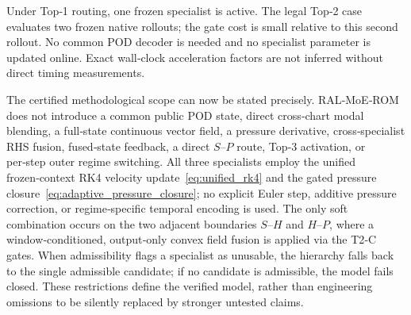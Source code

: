 Under Top‑1 routing, one frozen specialist is active.  The legal Top‑2
case evaluates two frozen native rollouts; the gate cost is small relative
to this second rollout.  No common POD decoder is needed and no specialist
parameter is updated online.  Exact wall‑clock acceleration factors are
not inferred without direct timing measurements.

The certified methodological scope can now be stated precisely.
RAL‑MoE‑ROM does not introduce a common public POD state, direct
cross‑chart modal blending, a full‑state continuous vector field, a
pressure derivative, cross‑specialist RHS fusion, fused‑state feedback, a
direct $S$--$P$ route, Top‑3 activation, or per‑step outer regime
switching.  All three specialists employ the unified frozen‑context RK4
velocity update~\eqref{eq:unified_rk4} and the gated pressure
closure~\eqref{eq:adaptive_pressure_closure}; no explicit Euler step,
additive pressure correction, or regime‑specific temporal encoding is
used.  The only soft combination occurs on the two adjacent boundaries
$S$--$H$ and $H$--$P$, where a window‑conditioned, output‑only convex
field fusion is applied via the T2‑C gates.  When admissibility flags a
specialist as unusable, the hierarchy falls back to the single admissible
candidate; if no candidate is admissible, the model fails closed.  These
restrictions define the verified model, rather than engineering omissions
to be silently replaced by stronger untested claims.



